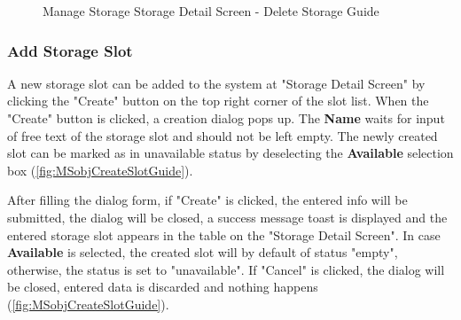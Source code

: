 \begin{figure}[H]
	\centering

    \caption{Manage Storage Storage Detail Screen - Delete Storage Guide}
	\label{fig:MSobjDeleteGuide}
\end{figure}


\subsubsection{Add Storage Slot}
\label{subsubsec:addSlot}

A new storage slot can be added to the system at "Storage Detail Screen" by clicking the "Create" button on the top right corner of the slot list.
When the "Create" button is clicked, a creation dialog pops up. The \textbf{Name} waits for input of free text of the storage slot and should not be left empty. The newly created slot can be marked as in unavailable status by deselecting the \textbf{Available} selection box (\autoref{fig:MSobjCreateSlotGuide}).

After filling the dialog form, if "Create" is clicked, the entered info will be submitted, the dialog will be closed, a success message toast is displayed and the entered storage slot appears in the table on the "Storage Detail Screen". In case \textbf{Available} is selected, the created slot will by default of status "empty", otherwise, the status is set to "unavailable". If "Cancel" is clicked, the dialog will be closed, entered data is discarded and nothing happens (\autoref{fig:MSobjCreateSlotGuide}).

